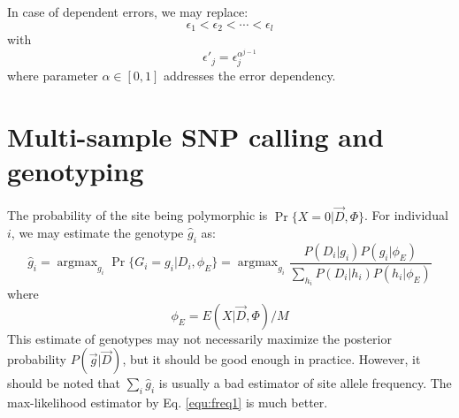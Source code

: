 \documentclass[pdftex,10pt]{book}
\DeclareMathOperator*{\argmax}{argmax}
\begin{document}
In case of dependent errors, we may replace:
\[\epsilon_1<\epsilon_2<\cdots<\epsilon_l\]
with
\[\epsilon'_j=\epsilon_j^{\alpha^{j-1}}\]
where parameter $\alpha\in[0,1]$ addresses the error dependency.

\section{Multi-sample SNP calling and genotyping}

The probability of the site being polymorphic is
$\Pr\{X=0|\vec{D},\Phi\}$. For individual $i$, we may estimate the
genotype $\hat{g}_i$ as:
$$
\hat{g}_i=\argmax_{g_i} \Pr\{G_i=g_i|D_i,\phi_E\}=\argmax_{g_i}\frac{P(D_i|g_i)P(g_i|\phi_E)}
{\sum_{h_i}P(D_i|h_i)P(h_i|\phi_E)}
$$
where
$$
\phi_E=E(X|\vec{D},\Phi)/M
$$
This estimate of genotypes may not necessarily maximize the posterior
probability $P(\vec{g}|\vec{D})$, but it should be good enough in
practice. However, it should be noted that $\sum_i\hat{g}_i$ is usually
a bad estimator of site allele frequency. The max-likelihood estimator
by Eq. \eqref{equ:freq1} is much better.
\end{document}
